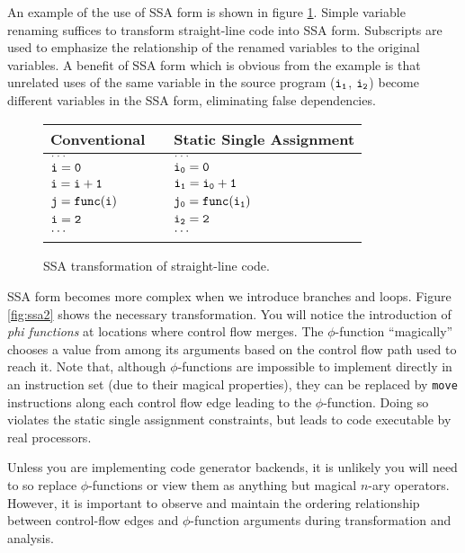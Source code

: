 \documentclass[11pt,notitlepage,twocolumn,twoside]{article}
\newcommand{\phifunction}{$\phi$-function}
\begin{document}
An example of the use of SSA form is shown in figure \ref{fig:ssa1}.
Simple variable renaming suffices to transform straight-line code into
SSA form.  Subscripts are used to emphasize the relationship of the
renamed variables to the original variables.  A benefit of SSA form
which is obvious from the example is that unrelated uses of the same variable
in the source program ($\tt i_1$, $\tt i_2$) become different
variables in the SSA form, eliminating false dependencies.

\begin{figure}[t]
\begin{tabular}{lll}
Conventional    && Static Single Assignment \\ \hline
$\tt \ldots$    && $\tt \ldots$ \\
$\tt i=0$       && $\tt i_0 = 0$ \\
$\tt i=i+1$     && $\tt i_1 = i_0 + 1$ \\
$\tt j=func(i)$ && $\tt j_0 = func(i_1)$ \\
$\tt i=2$       && $\tt i_2 = 2$ \\
$\tt \ldots$    && $\tt \ldots$ \\
\\
\end{tabular}
\caption{SSA transformation of straight-line code.}
\label{fig:ssa1}
\end{figure}

SSA form becomes more complex when we
introduce branches and loops.  Figure \ref{fig:ssa2} shows the
necessary transformation.  You will notice the introduction of
\textit{phi functions} at locations where control flow merges.  The
\phifunction{} ``magically'' chooses a value from among its arguments
based on the control flow path used to reach it.  Note that, although
\phifunction{s} are impossible to implement directly in an instruction set
(due to their magical properties), they can be replaced by \texttt{move}
instructions along each control flow edge leading to the
\phifunction{}.  Doing so violates the static single assignment
constraints, but leads to code executable by real processors.

Unless you are implementing code generator backends, it is unlikely
you will need to so replace \phifunction{s} or view them as anything
but magical $n$-ary operators.  However, it is important to observe and 
maintain the ordering relationship between control-flow edges and 
\phifunction{} arguments during transformation and analysis.
\end{document}

